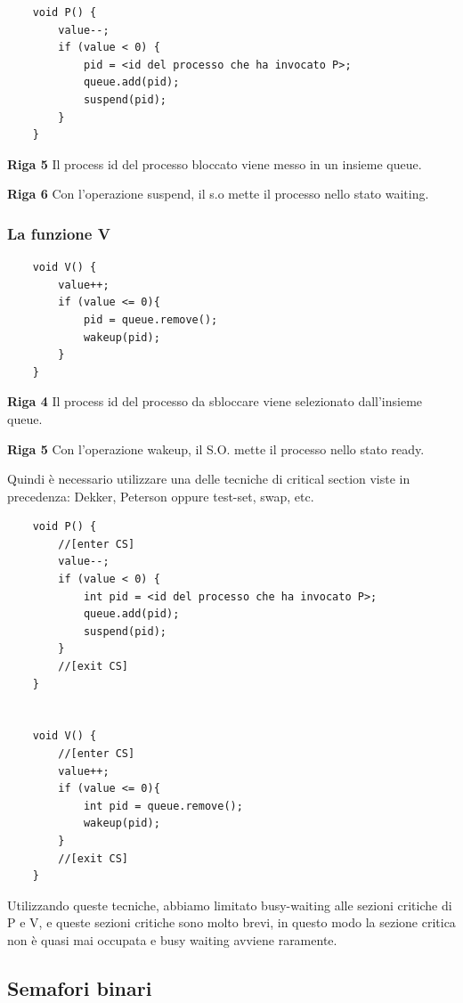 \begin{lstlisting}
    void P() {
        value--;
        if (value < 0) {
            pid = <id del processo che ha invocato P>;
            queue.add(pid);
            suspend(pid);
        }
    }
\end{lstlisting}    

\textbf{Riga 5} Il process id del processo bloccato viene messo in un insieme queue.

\textbf{Riga 6} Con l'operazione suspend, il s.o mette il processo nello stato waiting.

\subsubsection{La funzione V}

\begin{lstlisting}
    void V() {
        value++;
        if (value <= 0){
            pid = queue.remove();
            wakeup(pid);
        }
    }
\end{lstlisting}

\textbf{Riga 4} Il process id del processo da sbloccare viene selezionato dall'insieme queue.

\textbf{Riga 5} Con l'operazione wakeup, il S.O. mette il processo nello stato ready.
\newline

Quindi è necessario utilizzare una delle tecniche di critical section viste in precedenza: Dekker, Peterson oppure test-set, swap, etc.

\begin{lstlisting}
    void P() {
        //[enter CS]
        value--;
        if (value < 0) {
            int pid = <id del processo che ha invocato P>;
            queue.add(pid);
            suspend(pid);
        }
        //[exit CS]
    }
    

    void V() {
        //[enter CS]
        value++;
        if (value <= 0){
            int pid = queue.remove();
            wakeup(pid);
        }
        //[exit CS]
    }
\end{lstlisting}

Utilizzando queste tecniche, abbiamo limitato busy-waiting alle sezioni critiche di P e V, e queste sezioni critiche sono molto brevi, in questo modo la sezione critica non è quasi mai occupata
e busy waiting avviene raramente.

\subsection{Semafori binari}


